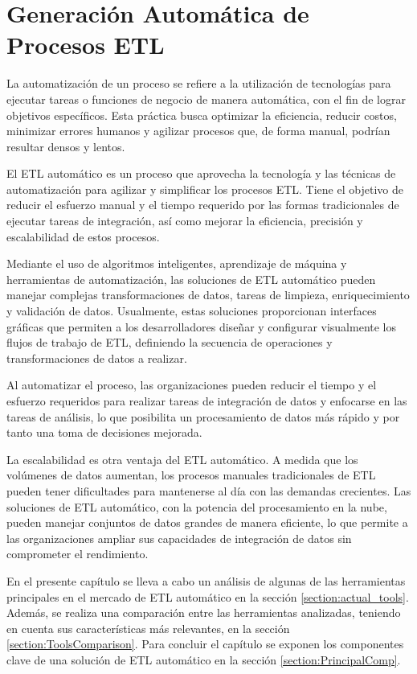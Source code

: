 \chapter{Generaci\'on Autom\'atica de Procesos ETL}\label{chapter:auto-etl}

La automatización de un proceso se refiere a la utilización de tecnologías para ejecutar tareas o funciones de 
negocio de manera automática, con el fin de lograr objetivos 
específicos. Esta práctica busca optimizar la eficiencia, reducir costos, minimizar errores humanos y agilizar 
procesos que, de forma manual, podrían resultar densos y lentos.

El ETL automático es un proceso que 
aprovecha la tecnología y las técnicas de automatización para agilizar y simplificar los procesos ETL. Tiene el objetivo 
de reducir el esfuerzo manual y el tiempo requerido por las formas tradicionales de ejecutar tareas de integración, 
as\'i como mejorar la eficiencia, precisión y escalabilidad de estos procesos.

Mediante el uso de algoritmos inteligentes, aprendizaje de m\'aquina y herramientas de automatización, las soluciones de 
ETL automático pueden manejar complejas transformaciones de datos, tareas de limpieza, enriquecimiento 
y validación de datos. Usualmente, estas soluciones proporcionan interfaces gráficas que permiten a los 
desarrolladores diseñar y configurar visualmente los flujos de trabajo de ETL, definiendo la secuencia de operaciones y 
transformaciones de datos a realizar.

Al automatizar el proceso, las 
organizaciones pueden reducir el tiempo y el esfuerzo requeridos para realizar tareas de integración de 
datos y enfocarse en las tareas de an\'alisis, lo que posibilita un procesamiento de datos más rápido y 
por tanto una toma de decisiones mejorada.

La escalabilidad es otra ventaja del ETL automático. A medida que los volúmenes de datos aumentan, los procesos manuales 
tradicionales de ETL pueden tener dificultades para mantenerse al día con las demandas crecientes. Las soluciones de ETL 
automático, con la potencia del procesamiento en la nube, pueden manejar conjuntos de datos grandes de manera eficiente, 
lo que permite a las organizaciones ampliar sus capacidades de integración de datos sin comprometer el rendimiento.

En el presente cap\'itulo se lleva a cabo un análisis de algunas de las herramientas principales en el 
mercado de ETL automático en la sección \ref{section:actual_tools}. Además, se realiza una comparación entre las 
herramientas analizadas, teniendo en cuenta sus características más relevantes, en la sección 
\ref{section:ToolsComparison}. Para concluir el cap\'itulo se exponen los componentes clave de una solución de 
ETL automático en la sección \ref{section:PrincipalComp}.


